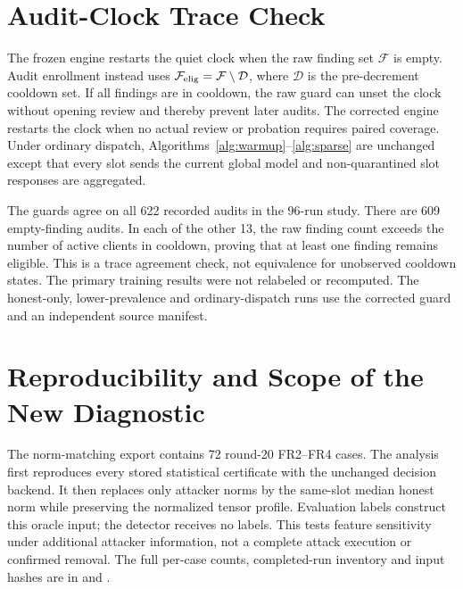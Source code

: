 \documentclass[journal]{IEEEtran}
\begin{document}
\section{Audit-Clock Trace Check}\label{app:audit-clock}
The frozen engine restarts the quiet clock when the raw finding set
$\mathcal F$ is empty. Audit enrollment instead uses
$\mathcal F_{\rm elig}=\mathcal F\setminus\mathcal D$, where $\mathcal D$
is the pre-decrement cooldown set. If all findings are in cooldown,
the raw guard can unset the clock without opening review and thereby
prevent later audits. The corrected engine restarts the clock
when no actual review or probation requires paired coverage. Under
ordinary dispatch, Algorithms~\ref{alg:warmup}--\ref{alg:sparse} are
unchanged except that every slot sends the current global model and
non-quarantined slot responses are aggregated.

The guards agree on all 622 recorded audits in the 96-run study.
There are 609 empty-finding audits. In each of the other 13, the raw
finding count exceeds the number of active clients in cooldown, proving
that at least one finding remains eligible. This is a trace agreement
check, not equivalence for unobserved cooldown states. The primary
training results were not relabeled or recomputed. The honest-only,
lower-prevalence and ordinary-dispatch runs use the corrected guard and
an independent source manifest.

\section{Reproducibility and Scope of the New Diagnostic}
The norm-matching export contains 72 round-20 FR2--FR4 cases. The analysis
first reproduces every stored statistical certificate with the unchanged
decision backend. It then replaces only attacker norms by the same-slot
median honest norm while preserving the normalized tensor profile.
Evaluation labels construct this oracle input; the detector receives no
labels. This tests feature sensitivity under additional attacker
information, not a complete attack execution or confirmed removal.
The full per-case counts, completed-run inventory and input hashes are
in  and .



\end{document}
